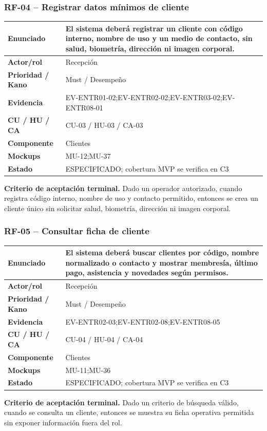 \documentclass[11pt,a4paper,twoside]{article}
\begin{document}
\subsubsection{RF-04 -- Registrar datos mínimos de cliente}
\begin{tabularx}{\textwidth}{|>{\bfseries}p{3.2cm}|X|}\hline
Enunciado & El sistema deberá registrar un cliente con código interno, nombre de uso y un medio de contacto, sin salud, biometría, dirección ni imagen corporal. \\ \hline
Actor/rol & Recepción \\ \hline
Prioridad / Kano & Must / Desempeño \\ \hline
Evidencia & EV-ENTR01-02;EV-ENTR02-02;EV-ENTR03-02;EV-ENTR08-01 \\ \hline
CU / HU / CA & CU-03 / HU-03 / CA-03 \\ \hline
Componente & Clientes \\ \hline
Mockups & MU-12;MU-37 \\ \hline
Estado & ESPECIFICADO; cobertura MVP se verifica en C3 \\ \hline
\end{tabularx}
\textbf{Criterio de aceptación terminal.} Dado un operador autorizado, cuando registra código interno, nombre de uso y contacto permitido, entonces se crea un cliente único sin solicitar salud, biometría, dirección ni imagen corporal.
\subsubsection{RF-05 -- Consultar ficha de cliente}
\begin{tabularx}{\textwidth}{|>{\bfseries}p{3.2cm}|X|}\hline
Enunciado & El sistema deberá buscar clientes por código, nombre normalizado o contacto y mostrar membresía, último pago, asistencia y novedades según permisos. \\ \hline
Actor/rol & Recepción \\ \hline
Prioridad / Kano & Must / Desempeño \\ \hline
Evidencia & EV-ENTR02-03;EV-ENTR02-08;EV-ENTR08-05 \\ \hline
CU / HU / CA & CU-04 / HU-04 / CA-04 \\ \hline
Componente & Clientes \\ \hline
Mockups & MU-11;MU-36 \\ \hline
Estado & ESPECIFICADO; cobertura MVP se verifica en C3 \\ \hline
\end{tabularx}
\textbf{Criterio de aceptación terminal.} Dado un criterio de búsqueda válido, cuando se consulta un cliente, entonces se muestra su ficha operativa permitida sin exponer información fuera del rol.
\end{document}

